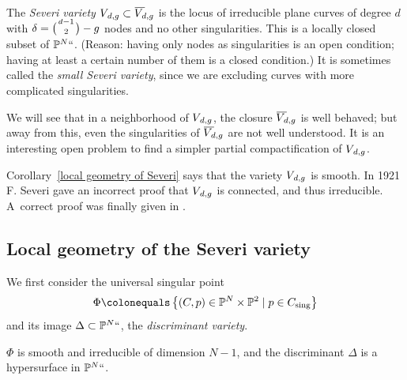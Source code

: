 \begin{definition}
The \emph{Severi variety} 
%
$\Vdg \subset \Vdgbar$ is the locus of irreducible plane curves of
% 
degree $d$ with $\delta = \tbinom{d-1}{2} - g$ nodes and no other
singularities. This is a locally closed subset of ${\mathbb P}^N` `$.
(Reason: having only nodes as singularities is an open condition; having at least a certain number of them
is a closed condition.)
It is sometimes
%
called the \emph{small Severi variety}, since we are excluding curves with more complicated singularities.
\end{definition}

We will see that in a neighborhood of $V_{\kern1ptd,g}$, the closure
$\Vdgbar$ is well behaved; but away from this, even the singularities
of $\Vdgbar$ are not well understood. It 
is an interesting open
problem to find a simpler partial compactification of $ V_{\kern1ptd,g}$.

\begin{fact}\label{severi irreducible}
Corollary~\ref{local geometry of Severi} says that
the variety $V_{\kern1ptd,g}$ is smooth. In 1921 F. Severi gave an incorrect
proof 
that $V_{\kern1ptd,g}$ is
connected, and thus irreducible. 
%
%
A~correct proof was finally given in \cite{MR837522}.
\end{fact}


\subsection*{Local geometry of the Severi variety}

We first consider the 
%
%
universal singular point
$$
\Phi \colonequals  \left\{ (C, p) \in \PP^N \times \PP^2 \mid p \in C_{\sing} \right\}
$$
and its image $\Delta\subset {\mathbb P}^N` `$, the \emph{discriminant variety}.
%

\begin{proposition}
\label{local severi geometry}
 $\Phi$
is smooth and irreducible of dimension $N-1$,
and the discriminant $\Delta$ is a hypersurface in ${\mathbb P}^N` `$.
\unif
\end{proposition}

